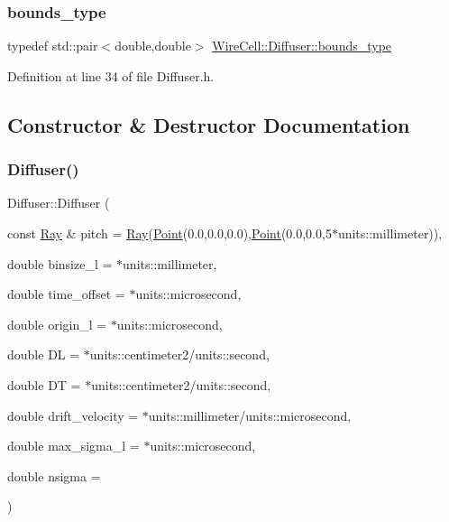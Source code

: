 \subsubsection{\texorpdfstring{bounds\+\_\+type}{bounds\_type}}
{\footnotesize\ttfamily typedef std\+::pair$<$double,double$>$ \hyperlink{class_wire_cell_1_1_diffuser_a5ec949c1c222b25d1db6542dacc6d983}{Wire\+Cell\+::\+Diffuser\+::bounds\+\_\+type}}



Definition at line 34 of file Diffuser.\+h.



\subsection{Constructor \& Destructor Documentation}
\mbox{\label{class_wire_cell_1_1_diffuser_ae3799af3be7fe101ddeaacea1c1b4903}} 
\subsubsection{\texorpdfstring{Diffuser()}{Diffuser()}}
{\footnotesize\ttfamily Diffuser\+::\+Diffuser (\begin{DoxyParamCaption}\item[{const \hyperlink{namespace_wire_cell_a3ab20d9b438feb7eb1ffaab9ba98af0c}{Ray} \&}]{pitch = {\ttfamily \hyperlink{namespace_wire_cell_a3ab20d9b438feb7eb1ffaab9ba98af0c}{Ray}(\hyperlink{namespace_wire_cell_ab2b2565fa6432efbb4513c14c988cda9}{Point}(0.0,0.0,0.0),\hyperlink{namespace_wire_cell_ab2b2565fa6432efbb4513c14c988cda9}{Point}(0.0,0.0,5$\ast$units\+:\+:millimeter))},  }\item[{double}]{binsize\+\_\+l = {$\ast$units\+:\+:millimeter},  }\item[{double}]{time\+\_\+offset = {$\ast$units\+:\+:microsecond},  }\item[{double}]{origin\+\_\+l = {$\ast$units\+:\+:microsecond},  }\item[{double}]{DL = {$\ast$units\+:\+:centimeter2/units\+:\+:second},  }\item[{double}]{DT = {$\ast$units\+:\+:centimeter2/units\+:\+:second},  }\item[{double}]{drift\+\_\+velocity = {$\ast$units\+:\+:millimeter/units\+:\+:microsecond},  }\item[{double}]{max\+\_\+sigma\+\_\+l = {$\ast$units\+:\+:microsecond},  }\item[{double}]{nsigma = {} }\end{DoxyParamCaption})}

